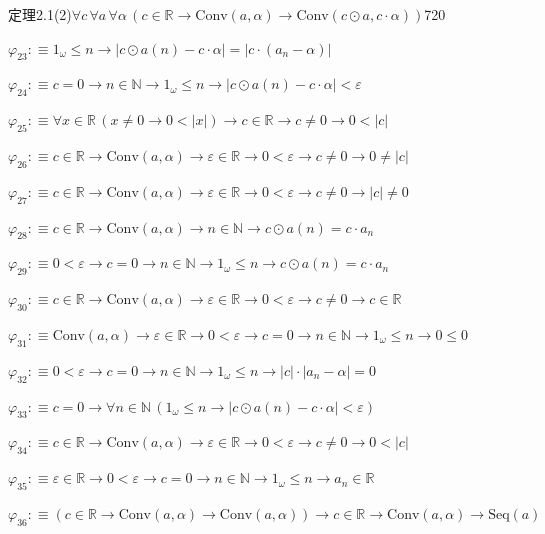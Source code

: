 \begin{fullproof}{定理2.1(2)}{$\forall c\,\forall a\,\forall \alpha\,(c \in \mathbb{R} \to \mathrm{Conv}(a,\alpha) \to \mathrm{Conv}(c \odot a,c \cdot \alpha))$}{720}
\begin{abbrevlist}
\item $\varphi_{23} :\equiv 1_{\omega} \leq n \to \lvert c \odot a(n) - c \cdot \alpha \rvert = \lvert c \cdot (a_{n} - \alpha) \rvert$
\item $\varphi_{24} :\equiv c = 0 \to n \in \mathbb{N} \to 1_{\omega} \leq n \to \lvert c \odot a(n) - c \cdot \alpha \rvert < \varepsilon$
\item $\varphi_{25} :\equiv \forall x \in \mathbb{R}\,(x \neq 0 \to 0 < \lvert x \rvert) \to c \in \mathbb{R} \to c \neq 0 \to 0 < \lvert c \rvert$
\item $\varphi_{26} :\equiv c \in \mathbb{R} \to \mathrm{Conv}(a,\alpha) \to \varepsilon \in \mathbb{R} \to 0 < \varepsilon \to c \neq 0 \to 0 \neq \lvert c \rvert$
\item $\varphi_{27} :\equiv c \in \mathbb{R} \to \mathrm{Conv}(a,\alpha) \to \varepsilon \in \mathbb{R} \to 0 < \varepsilon \to c \neq 0 \to \lvert c \rvert \neq 0$
\item $\varphi_{28} :\equiv c \in \mathbb{R} \to \mathrm{Conv}(a,\alpha) \to n \in \mathbb{N} \to c \odot a(n) = c \cdot a_{n}$
\item $\varphi_{29} :\equiv 0 < \varepsilon \to c = 0 \to n \in \mathbb{N} \to 1_{\omega} \leq n \to c \odot a(n) = c \cdot a_{n}$
\item $\varphi_{30} :\equiv c \in \mathbb{R} \to \mathrm{Conv}(a,\alpha) \to \varepsilon \in \mathbb{R} \to 0 < \varepsilon \to c \neq 0 \to c \in \mathbb{R}$
\item $\varphi_{31} :\equiv \mathrm{Conv}(a,\alpha) \to \varepsilon \in \mathbb{R} \to 0 < \varepsilon \to c = 0 \to n \in \mathbb{N} \to 1_{\omega} \leq n \to 0 \leq 0$
\item $\varphi_{32} :\equiv 0 < \varepsilon \to c = 0 \to n \in \mathbb{N} \to 1_{\omega} \leq n \to \lvert c \rvert \cdot \lvert a_{n} - \alpha \rvert = 0$
\item $\varphi_{33} :\equiv c = 0 \to \forall n \in \mathbb{N}\,(1_{\omega} \leq n \to \lvert c \odot a(n) - c \cdot \alpha \rvert < \varepsilon)$
\item $\varphi_{34} :\equiv c \in \mathbb{R} \to \mathrm{Conv}(a,\alpha) \to \varepsilon \in \mathbb{R} \to 0 < \varepsilon \to c \neq 0 \to 0 < \lvert c \rvert$
\item $\varphi_{35} :\equiv \varepsilon \in \mathbb{R} \to 0 < \varepsilon \to c = 0 \to n \in \mathbb{N} \to 1_{\omega} \leq n \to a_{n} \in \mathbb{R}$
\item $\varphi_{36} :\equiv (c \in \mathbb{R} \to \mathrm{Conv}(a,\alpha) \to \mathrm{Conv}(a,\alpha)) \to c \in \mathbb{R} \to \mathrm{Conv}(a,\alpha) \to \mathrm{Seq}(a)$

\end{abbrevlist}
\end{fullproof}
